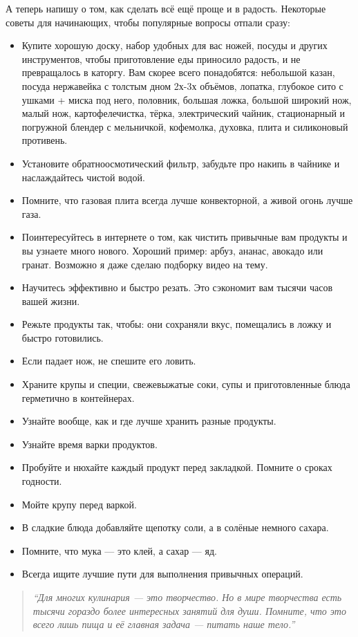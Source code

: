 А теперь напишу о том, как сделать всё ещё проще и в радость. Некоторые советы для начинающих, чтобы популярные вопросы отпали сразу:
\begin{itemize}
\item  Купите хорошую доску, набор удобных для вас ножей, посуды и других инструментов, чтобы приготовление еды приносило радость, и не превращалось в каторгу. Вам скорее всего понадобятся: небольшой казан, посуда нержавейка с толстым дном 2х-3х объёмов, лопатка, глубокое сито с ушками + миска под него, половник, большая ложка, большой широкий нож, малый нож, картофелечистка, тёрка, электрический чайник, стационарный и погружной блендер с мельничкой, кофемолка, духовка, плита и силиконовый противень.
\item  Установите обратноосмотический фильтр, забудьте про накипь в чайнике и наслаждайтесь чистой водой.
\item  Помните, что газовая плита всегда лучше конвекторной, а живой огонь лучше газа.
\item  Поинтересуйтесь в интернете о том, как чистить привычные вам продукты и вы узнаете много нового. Хороший пример: арбуз, ананас, авокадо или гранат. Возможно я даже сделаю подборку видео на тему.
\item  Научитесь эффективно и быстро резать. Это сэкономит вам тысячи часов вашей жизни.
\item  Режьте продукты так, чтобы: они сохраняли вкус, помещались в ложку и быстро готовились.
\item  Если падает нож, не спешите его ловить.
\item  Храните крупы и специи, свежевыжатые соки, супы и приготовленные блюда герметично в контейнерах.
\item  Узнайте вообще, как и где лучше хранить разные продукты.
\item  Узнайте время варки продуктов.
\item  Пробуйте и нюхайте каждый продукт перед закладкой. Помните о сроках годности.
\item  Мойте крупу перед варкой.
\item  В сладкие блюда добавляйте щепотку соли, а в солёные немного сахара.
\item  Помните, что мука — это клей, а сахар — яд.
\item  Всегда ищите лучшие пути для выполнения привычных операций.
\end{itemize}

\begin{quote}
    \emph{``Для многих кулинария — это творчество. Но в мире творчества есть тысячи гораздо более интересных занятий для души. Помните, что это всего лишь пища и её главная задача — питать наше тело.''}

\end{quote}


